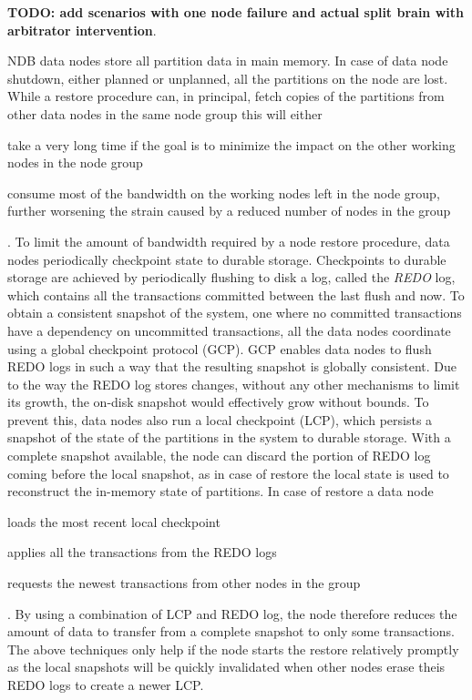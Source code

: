 \textbf{TODO: add scenarios with one node failure and actual split brain with arbitrator intervention}.

NDB data nodes store all partition data in main memory.
In case of data node shutdown, either planned or unplanned, all the partitions on the node are lost.
While a restore procedure can, in principal, fetch copies of the partitions from other data nodes in the same node group this will either \begin{inparaenum}[1)]
    \item take a very long time if the goal is to minimize the impact on the other working nodes in the node group
    \item consume most of the bandwidth on the working nodes left in the node group, further worsening the strain caused by a reduced number of nodes in the group
\end{inparaenum}.
To limit the amount of bandwidth required by a node restore procedure, data nodes periodically checkpoint state to durable storage.
Checkpoints to durable storage are achieved by periodically flushing to disk a log, called the \emph{REDO} log, which contains all the transactions committed between the last flush and now.
To obtain a consistent snapshot of the system, one where no committed transactions have a dependency on uncommitted transactions, all the data nodes coordinate using a global checkpoint protocol (GCP).
GCP enables data nodes to flush REDO logs in such a way that the resulting snapshot is globally consistent.
Due to the way the REDO log stores changes, without any other mechanisms to limit its growth, the on-disk snapshot would effectively grow without bounds.
To prevent this, data nodes also run a local checkpoint (LCP), which persists a snapshot of the state of the partitions in the system to durable storage.
With a complete snapshot available, the node can discard the portion of REDO log coming before the local snapshot, as in case of restore the local state is used to reconstruct the in-memory state of partitions.
In case of restore a data node \begin{inparaenum}[i)]
    \item loads the most recent local checkpoint
    \item applies all the transactions from the REDO logs
    \item requests the newest transactions from other nodes in the group
\end{inparaenum}.
By using a combination of LCP and REDO log, the node therefore reduces the amount of data to transfer from a complete snapshot to only some transactions.
The above techniques only help if the node starts the restore relatively promptly as the local snapshots will be quickly invalidated when other nodes erase theis REDO logs to create a newer LCP.


